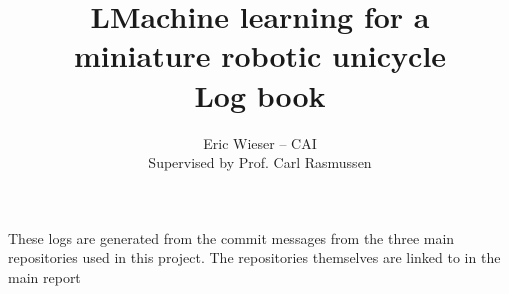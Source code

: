 \documentclass[10pt,a4paper]{article}
\begin{document}
	\author{Eric Wieser -- CAI\\Supervised by Prof. Carl Rasmussen}
	\title{LMachine learning for a\\miniature robotic unicycle\\Log book}
	\maketitle

	These logs are generated from the commit messages from the three main repositories used in this project.
	The repositories themselves are linked to in the main report

	
\end{document}
